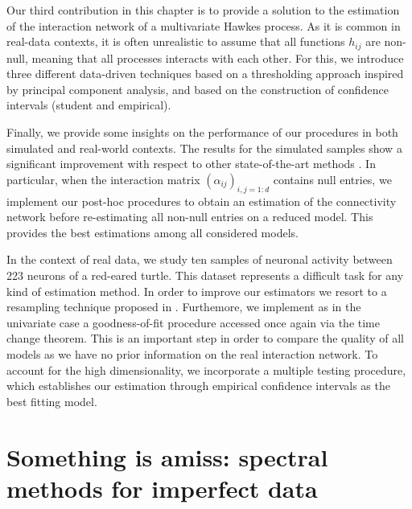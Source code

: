       Our third contribution in this chapter is to provide a solution to the estimation of the interaction network of a multivariate Hawkes process.
      As it is common in real-data contexts, it is often unrealistic to assume that all functions $h_{ij}$ are non-null, meaning that all processes interacts with each other.
      For this, we introduce three different data-driven techniques based on a thresholding approach inspired by principal component analysis, and based on the construction of confidence intervals (student and empirical).

      Finally, we provide some insights on the performance of our procedures in both simulated and real-world contexts.
      The results for the simulated samples show a significant improvement with respect to other state-of-the-art methods \parencite{Lemonnier2014, Bacry2020}.
      In particular, when the interaction matrix $(\alpha_{ij})_{i,j=1:d}$ contains null entries, we implement our post-hoc procedures to obtain an estimation of the connectivity network before re-estimating all non-null entries on a reduced model.
      This provides the best estimations among all considered models.
      
      In the context of real data, we study ten samples of neuronal activity between 223 neurons of a red-eared turtle.
      This dataset represents a difficult task for any kind of estimation method. In order to improve our estimators we resort to a resampling technique proposed in \textcite{Reynaud2014}.
      Furthemore, we implement as in the univariate case a goodness-of-fit procedure accessed once again via the time change theorem.
      This is an important step in order to compare the quality of all models as we have no prior information on the real interaction network.
      To account for the high dimensionality, we incorporate a multiple testing procedure, which establishes our estimation through empirical confidence intervals as the best fitting model.




\section{Something is amiss: spectral methods for imperfect data}\label{sec:chap0_missing_data}
    
